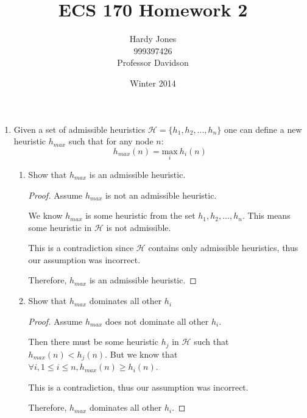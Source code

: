 \documentclass[12pt,letterpaper]{article}
\title{ECS 170 Homework 2\vspace{-2ex}}
\author{Hardy Jones\\
        999397426\\
        Professor Davidson\vspace{-2ex}}
\date{Winter 2014}
\begin{document}
  \maketitle

  \begin{enumerate}
    \item
      Given a set of admissible heuristics $\mathcal{H} = \{h_1, h_2, ..., h_n\}$ one can define a new heuristic $h_{max}$ such that for any node $n$:
      \[
        h_{max}(n) = \underset{i}{\text{max}} \ h_i(n)
      \]
      \begin{enumerate}
        \item Show that $h_{max}$ is an admissible heuristic.

          \begin{proof}
            Assume $h_{max}$ is not an admissible heuristic.

            We know $h_{max}$ is some heuristic from the set $h_1, h_2, ..., h_n$.
            This means some heuristic in $\mathcal{H}$ is not admissible.

            This is a contradiction since $\mathcal{H}$ contains only admissible heuristics,
            thus our assumption was incorrect.

            Therefore, $h_{max}$ is an admissible heuristic.
          \end{proof}
        \item Show that $h_{max}$ dominates all other $h_i$

          \begin{proof}
            Assume $h_{max}$ does not dominate all other $h_i$.

            Then there must be some heuristic $h_j$ in $\mathcal{H}$ such that $h_{max}(n) < h_j(n)$.
            But we know that $\forall i, 1 \le i \le n, h_{max}(n) \ge h_i(n)$.

            This is a contradiction, thus our assumption was incorrect.

            Therefore, $h_{max}$ dominates all other $h_i$.
          \end{proof}
      \end{enumerate}
  \end{enumerate}
\end{document}
